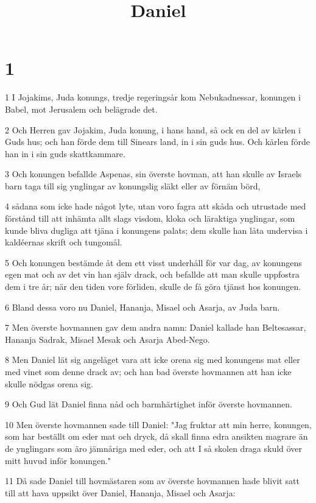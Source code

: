 

\title{Daniel}


\chapter{1}

\par 1 I Jojakims, Juda konungs, tredje regeringsår kom Nebukadnessar, konungen i Babel, mot Jerusalem och belägrade det.
\par 2 Och Herren gav Jojakim, Juda konung, i hans hand, så ock en del av kärlen i Guds hus; och han förde dem till Sinears land, in i sin guds hus. Och kärlen förde han in i sin guds skattkammare.
\par 3 Och konungen befallde Aspenas, sin överste hovman, att han skulle av Israels barn taga till sig ynglingar av konungslig släkt eller av förnäm börd,
\par 4 sådana som icke hade något lyte, utan voro fagra att skåda och utrustade med förstånd till att inhämta allt slags visdom, kloka och läraktiga ynglingar, som kunde bliva dugliga att tjäna i konungens palats; dem skulle han låta undervisa i kaldéernas skrift och tungomål.
\par 5 Och konungen bestämde åt dem ett visst underhåll för var dag, av konungens egen mat och av det vin han själv drack, och befallde att man skulle uppfostra dem i tre år; när den tiden vore förliden, skulle de få göra tjänst hos konungen.
\par 6 Bland dessa voro nu Daniel, Hananja, Misael och Asarja, av Juda barn.
\par 7 Men överste hovmannen gav dem andra namn: Daniel kallade han Beltesassar, Hananja Sadrak, Misael Mesak och Asarja Abed-Nego.
\par 8 Men Daniel lät sig angeläget vara att icke orena sig med konungens mat eller med vinet som denne drack av; och han bad överste hovmannen att han icke skulle nödgas orena sig.
\par 9 Och Gud lät Daniel finna nåd och barmhärtighet inför överste hovmannen.
\par 10 Men överste hovmannen sade till Daniel: "Jag fruktar att min herre, konungen, som har beställt om eder mat och dryck, då skall finna edra ansikten magrare än de ynglingars som äro jämnåriga med eder, och att I så skolen draga skuld över mitt huvud inför konungen."
\par 11 Då sade Daniel till hovmästaren som av överste hovmannen hade blivit satt till att hava uppsikt över Daniel, Hananja, Misael och Asarja:
